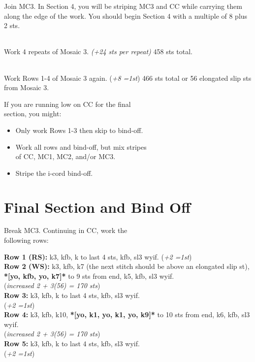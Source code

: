 \documentclass[12pt]{article}
\newcommand{\rowDir}[1]{\textbf{#1:}} %
\renewcommand{\repeat}[1]{\textbf{*[#1]*}} %
\newcommand{\increase}[1]{(\emph{+#1 
	\ifnum#1=1{st}\else{sts}\fi})}
\newenvironment{frnote}
    {%
    	\setlength{\FrameRule}{1.5pt}
    	\def\FrameCommand{\fboxrule=\FrameRule\fboxsep=\FrameSep \fcolorbox{framecolor}{shadecolor}}
    	\MakeFramed {\FrameRestore}}
    {\setlength{\FrameRule}{1pt}
	\endMakeFramed}
\begin{document}
\begin{multicols}{2}
Join MC3. In Section 4, you will be striping MC3 and CC while carrying them along the edge of the work. You should begin Section 4 with a multiple of 8 plus 2 sts. 

~\\
Work 4 repeats of Mosaic 3. \emph{(+24 sts per repeat)} 458 sts total.

~\\
Work Rows 1-4 of Mosaic 3 again. \increase{8} 466 sts total or 56 elongated slip sts from Mosaic 3.

\begin{frnote}
If you are running low on CC for the final \\ section, you might:
\vspace{-.5em}
\begin{itemize} \small
\item Only work Rows 1-3 then skip to bind-off. \vspace{-1em}
\item Work all rows and bind-off, but mix stripes \\ of CC, MC1, MC2, and/or MC3. \vspace{-1em}
\item Stripe the i-cord bind-off.
\end{itemize}
\end{frnote}

\vfill
\columnbreak

\section*{Final Section and Bind Off}

Break MC3. Continuing in CC, work the \\following rows:

\rowDir{Row 1 (RS)} k3, kfb, k to last 4 sts, kfb, sl3 wyif. \increase{2} \\
\rowDir{Row 2 (WS)} k3, kfb, k7 (the next stitch should be above an elongated slip st), \repeat{yo, kfb, yo, k7} to 9 sts from end, k5, kfb, sl3 wyif. \\ (\emph{increased 2 + 3(56) = 170 sts})\\
\rowDir{Row 3} k3, kfb, k to last 4 sts, kfb, sl3 wyif. \\ \increase{2} \\
\rowDir{Row 4} k3, kfb, k10, \repeat{yo, k1, yo, k1, yo, k9} to 10 sts from end, k6, kfb, sl3 wyif. \\ (\emph{increased 2 + 3(56) = 170 sts}) \\
\rowDir{Row 5} k3, kfb, k to last 4 sts, kfb, sl3 wyif. \\ \increase{2}


\end{multicols}
\end{document}
